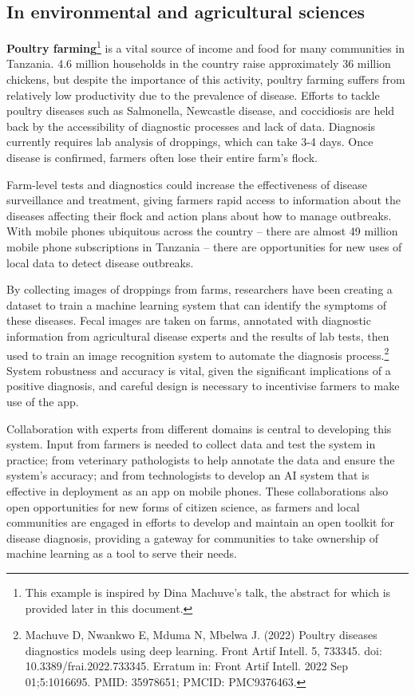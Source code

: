 {\hypertarget{in-environmental-and-agricultural-sciences}{%
\subsection{In environmental and agricultural
sciences}\label{in-environmental-and-agricultural-sciences}}

\textbf{Poultry farming}\footnote{This example is inspired by Dina
  Machuve's talk, the abstract for which is provided later in this
  document.} is a vital source of income and food for many communities
in Tanzania. 4.6 million households in the country raise approximately
36 million chickens, but despite the importance of this activity,
poultry farming suffers from relatively low productivity due to the
prevalence of disease. Efforts to tackle poultry diseases such as
Salmonella, Newcastle disease, and coccidiosis are held back by the
accessibility of diagnostic processes and lack of data. Diagnosis
currently requires lab analysis of droppings, which can take 3-4 days.
Once disease is confirmed, farmers often lose their entire farm's flock.

Farm-level tests and diagnostics could increase the effectiveness of
disease surveillance and treatment, giving farmers rapid access to
information about the diseases affecting their flock and action plans
about how to manage outbreaks. With mobile phones ubiquitous across the
country -- there are almost 49 million mobile phone subscriptions in
Tanzania -- there are opportunities for new uses of local data to detect
disease outbreaks.

By collecting images of droppings from farms, researchers have been
creating a dataset to train a machine learning system that can identify
the symptoms of these diseases. Fecal images are taken on farms,
annotated with diagnostic information from agricultural disease experts
and the results of lab tests, then used to train an image recognition
system to automate the diagnosis process.\footnote{Machuve D, Nwankwo E,
  Mduma N, Mbelwa J. (2022) Poultry diseases diagnostics models using
  deep learning. Front Artif Intell. 5, 733345. doi:
  10.3389/frai.2022.733345. Erratum in: Front Artif Intell. 2022 Sep
  01;5:1016695. PMID: 35978651; PMCID: PMC9376463.} System robustness
and accuracy is vital, given the significant implications of a positive
diagnosis, and careful design is necessary to incentivise farmers to
make use of the app.

Collaboration with experts from different domains is central to
developing this system. Input from farmers is needed to collect data and
test the system in practice; from veterinary pathologists to help
annotate the data and ensure the system's accuracy; and from
technologists to develop an AI system that is effective in deployment as
an app on mobile phones. These collaborations also open opportunities
for new forms of citizen science, as farmers and local communities are
engaged in efforts to develop and maintain an open toolkit for disease
diagnosis, providing a gateway for communities to take ownership of
machine learning as a tool to serve their needs.

}
